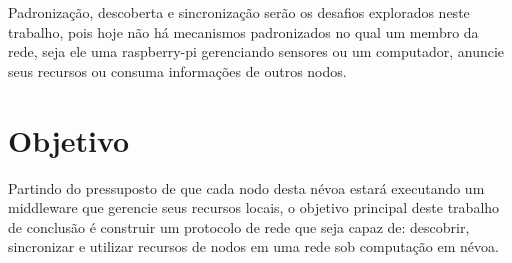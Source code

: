Padronização, descoberta e sincronização serão os desafios explorados neste trabalho, pois hoje não há mecanismos padronizados no qual um membro da rede, seja ele uma raspberry-pi gerenciando sensores ou um computador, anuncie seus recursos ou consuma informações de outros nodos.

\section{Objetivo}
                                                                                                                        
Partindo do pressuposto de que cada nodo desta névoa estará executando um middleware que gerencie seus recursos locais, o objetivo principal deste trabalho de conclusão é construir um protocolo de rede que seja capaz de: descobrir, sincronizar e utilizar recursos de nodos em uma rede sob computação em névoa.       






 
 
 
 
 
 
 
 









